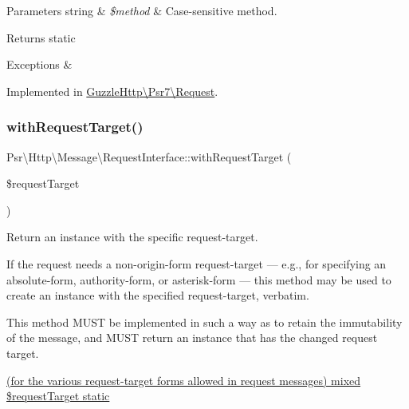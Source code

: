 \begin{DoxyParams}[1]{Parameters}
string & {\em \$method} & Case-\/sensitive method. \\
\hline
\end{DoxyParams}
\begin{DoxyReturn}{Returns}
static 
\end{DoxyReturn}

\begin{DoxyExceptions}{Exceptions}
{\em } & \\
\hline
\end{DoxyExceptions}


Implemented in \hyperlink{classGuzzleHttp_1_1Psr7_1_1Request_a6e111abeaf2e319e31599bb97c4111fa}{Guzzle\+Http\textbackslash{}\+Psr7\textbackslash{}\+Request}.

\mbox{\label{interfacePsr_1_1Http_1_1Message_1_1RequestInterface_a26d10ad91bf93238d7aa64d5469e06be}} 
\subsubsection{\texorpdfstring{with\+Request\+Target()}{withRequestTarget()}}
{\footnotesize\ttfamily Psr\textbackslash{}\+Http\textbackslash{}\+Message\textbackslash{}\+Request\+Interface\+::with\+Request\+Target (\begin{DoxyParamCaption}\item[{}]{\$request\+Target }\end{DoxyParamCaption})}

Return an instance with the specific request-\/target.

If the request needs a non-\/origin-\/form request-\/target — e.\+g., for specifying an absolute-\/form, authority-\/form, or asterisk-\/form — this method may be used to create an instance with the specified request-\/target, verbatim.

This method M\+U\+ST be implemented in such a way as to retain the immutability of the message, and M\+U\+ST return an instance that has the changed request target.

\hyperlink{}{(for the various request-\/target forms allowed in request messages)  mixed \$request\+Target  static }

